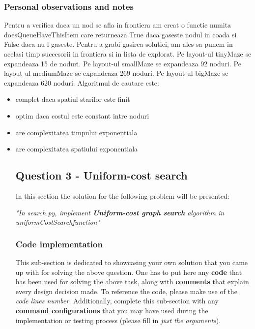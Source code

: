 \begin{itemize}
\subsubsection{Personal observations and notes}
Pentru a verifica daca un nod se afla in frontiera am creat o functie numita doesQueueHaveThisItem care returneaza True daca gaseste nodul in coada si False daca nu-l gaseste. \newline
Pentru a grabi gasirea solutiei, am ales sa punem in acelasi timp succesorii in frontiera si in lista de explorat. \newline
Pe layout-ul tinyMaze se expandeaza 15 de noduri. \newline
Pe layout-ul smallMaze se expandeaza 92 noduri. \newline
Pe layout-ul mediumMaze se expandeaza 269 noduri. \newline
Pe layout-ul bigMaze se expandeaza 620 noduri. \newline \newline
Algoritmul de cautare este: 
\begin{itemize}
\item complet daca spatiul starilor este finit
\item optim daca costul este constant intre noduri
\item are complexitatea timpului exponentiala 
\item are complexitatea spatiului exponentiala

\vspace{0.75cm}


\subsection{Question 3 - Uniform-cost search}
In this section the solution for the following problem will be presented:\newline

\textit{"In search.py,  implement  \textbf{Uniform-cost graph search} algorithm  in \textit{uniformCostSearchfunction}"}


\subsubsection{Code implementation}
This sub-section is dedicated to showcasing your own solution that you came up with for solving the above question. One has to put here any \textbf{code} that has been used for solving the above task, along with \textbf{comments} that explain every design decision made. To reference the code, please make use of the \textit{code lines number}. Additionally, complete this sub-section with any \textbf{command configurations} that you may have used during the implementation or testing process (please fill in \textit{just the arguments}). \newline



\end{itemize}
\end{itemize}
